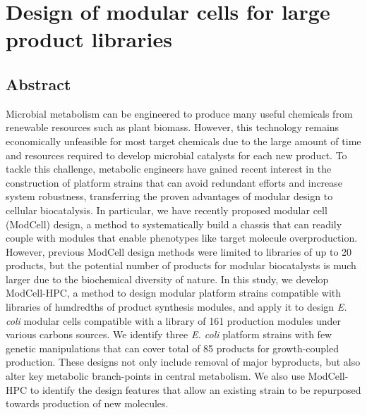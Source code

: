 \chapter{Design of modular cells for large product libraries}
\label{ch:hpc}

\section*{Abstract}
    Microbial metabolism can be engineered to produce many useful chemicals from renewable resources such as plant biomass.
    However, this technology remains economically unfeasible for most target chemicals due to the large amount of time and resources required to develop microbial catalysts for each new product.
    To tackle this challenge, metabolic engineers have gained recent interest in the construction of platform strains that can avoid redundant efforts and increase system robustness, transferring the proven advantages of modular design to cellular biocatalysis.
    In particular, we have recently proposed modular cell (ModCell) design, a method to systematically build a chassis that can readily couple with modules that enable phenotypes like target molecule overproduction.
    However, previous ModCell design methods were limited to libraries of up to 20 products, but the potential number of products for modular biocatalysts is much larger due to the biochemical diversity of nature.
    In this study, we develop ModCell-HPC, a method to design modular platform strains compatible with libraries of hundredths of product synthesis modules, and apply it to design \textit{E. coli} modular cells compatible with a library of 161 production modules under various carbons sources.
    We identify three \textit{E. coli} platform strains with few genetic manipulations that can cover total of 85 products for growth-coupled production.
    These designs not only include removal of major byproducts, but also alter key metabolic branch-points in central metabolism.
    We also use ModCell-HPC to identify the design features that allow an existing strain to be repurposed towards production of new molecules.
